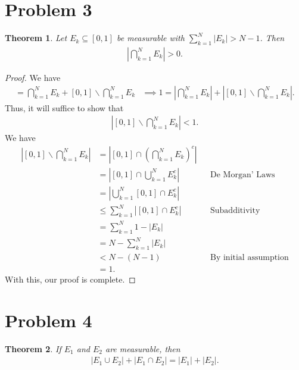 \documentclass[10pt,a4paper]{article}
\theoremstyle{theorem}
\newtheorem{theorem}{Theorem}
\theoremstyle{definition}
\begin{document}
\section*{Problem 3}
\begin{theorem}
Let $E_k \subseteq [0, 1]$ be measurable with $\sum_{k=1}^N |E_k| > N - 1$. Then 
\begin{align*}
| \bigcap_{k=1}^N E_k| > 0.
\end{align*}
\end{theorem}
\begin{proof}
We have 
\begin{align*}
[0, 1] =  \bigcap_{k=1}^N E_k + [0, 1]\backslash \bigcap_{k=1}^N E_k &\implies 1 = \left|\bigcap_{k=1}^N E_k \right| + \left|[0, 1]\backslash \bigcap_{k=1}^N E_k \right|.
\end{align*}
Thus, it will suffice to show that 
\begin{align*}
\left|[0, 1]\backslash \bigcap_{k=1}^N E_k \right| < 1.
\end{align*}
We have
\begin{align*}
\left|[0, 1]\backslash \bigcap_{k=1}^N E_k \right| &= \left|[0, 1]\cap \left( \bigcap_{k=1}^N E_k \right)^c \right|\\
&= \left|[0, 1]\cap \bigcup_{k=1}^N E^c_k  \right| &&\text{De Morgan' Laws}\\
&= \left| \bigcup_{k=1}^N [0, 1] \cap E^c_k  \right|\\
&\leq \sum_{k=1}^N |[0, 1] \cap E^c_k| &&\text{Subadditivity}\\
&= \sum_{k=1}^N 1 - |E_k|\\
&= N - \sum_{k=1}^N |E_k|\\
&< N - (N - 1) &&\text{By initial assumption}\\
&= 1.
\end{align*}
With this, our proof is complete.
\end{proof}

\section*{Problem 4}
\begin{theorem}
If $E_1$ and $E_2$ are measurable, then
\begin{align*}
|E_1 \cup E_2| + |E_1 \cap E_2| = |E_1| + |E_2|.
\end{align*}
\end{theorem}
\end{document}
